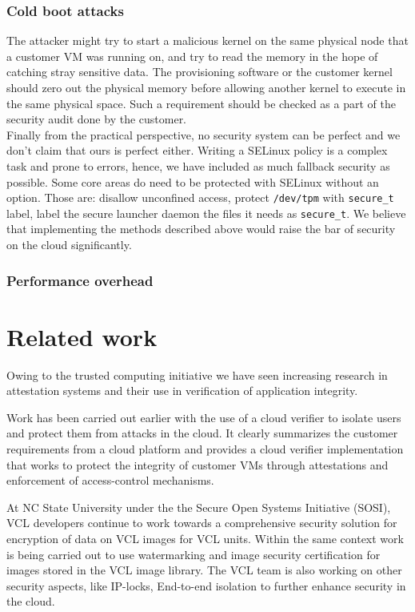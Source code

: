 \documentclass[10pt,twocolumn,pdftex]{article}
\begin{document}
\subsubsection{Cold boot attacks}
The attacker might try to start a malicious kernel on the same physical node that a customer VM was running on, and try to read the memory in the hope of catching stray sensitive data. The provisioning software or the customer kernel should zero out the physical memory before allowing another kernel to execute in the same physical space. Such a requirement should be checked as a part of the security audit done by the customer. 
\\

Finally from the practical perspective, no security system can be perfect and we don't claim that ours is perfect either. Writing a SELinux policy is a complex task and prone to errors, hence, we have included as much fallback security as possible. Some core areas do need to be protected with SELinux without an option. Those are: disallow unconfined access, protect {\tt /dev/tpm} with {\tt secure\_t} label, label the secure launcher daemon the files it needs as {\tt secure\_t}. We believe that implementing the methods described above would raise the bar of security on the cloud significantly.

\subsubsection{Performance overhead}

\section{Related work}
Owing to the trusted computing initiative we have seen increasing research in attestation systems \cite{springerlink:10.1007/s10207-011-0124-7} and their use in verification of application integrity. 

Work has been carried out earlier with the use of a cloud verifier \cite{seeding-clouds-with-trust-anchors} to isolate users and protect them from attacks in the cloud. It clearly summarizes the customer requirements from a cloud platform and provides a cloud verifier implementation that works to protect the integrity of customer VMs through attestations and enforcement of access-control mechanisms. 

At NC State University under the the Secure Open Systems Initiative (SOSI), VCL developers continue to work \cite{5429056} towards a comprehensive security solution for encryption of data on VCL images for VCL units. Within the same context work is being carried out to use watermarking and image security certification for images stored in the VCL image library. The VCL team is also working on other security aspects, like IP-locks, End-to-end isolation to further enhance security in the cloud.
\end{document}
